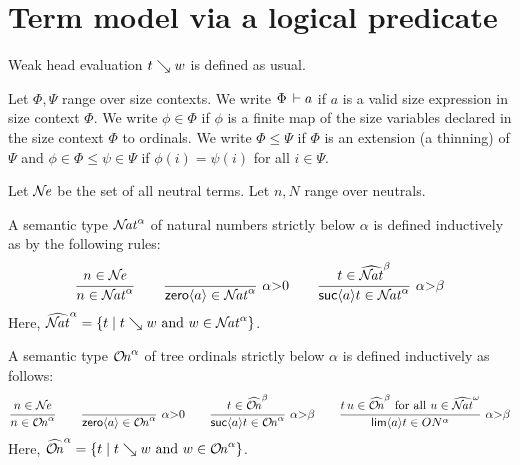 \documentclass[acmsmall,screen]{acmart}\settopmatter{}
\begin{document}
\section{Term model via a logical predicate}

Weak head evaluation $t \searrow w$ is defined as usual.

Let $\Phi,\Psi$ range over size contexts.  We write $\Phi \,\vdash a$ if
$a$ is a valid size expression in size context $\Phi$.
We write $\phi \in \Phi$ if $\phi$ is a finite map of the
size variables declared in the size context $\Phi$ to ordinals.
We write $\Phi \leq \Psi$ if $\Phi$ is an extension (a thinning) of
$\Psi$ and $\phi \in \Phi \leq \psi \in \Psi$ if $\phi(i) = \psi(i)$
for all $i \in \Psi$.

Let $\mathcal{N}\!\mathit{e}$ be the set of all neutral terms.  Let $n,N$ range over neutrals.

A semantic type ${\mathcal{N}\!\mathit{at}}^\alpha$ of natural numbers
strictly below $\alpha$ is defined inductively as by the following
rules:
\[
  \ru{n \in \NE
    }{n \in \NAT^\alpha}
\qquad
  \rux{
     }{\zero a \in \NAT^{\alpha}
     }{\alpha {>} 0}
\qquad
  \rux{t \in \NAThat^{\beta}
     }{\suc a t \in \NAT^{\alpha}
     }{\alpha {>} \beta}
\]
Here,
$\widehat{\mathcal{N}\!\mathit{at}}^\alpha = \{ t \mid t \searrow w \ \mbox{and}\  w \in {\mathcal{N}\!\mathit{at}}^\alpha \}$.

A semantic type ${\mathcal{O}\!\mathit{n}}^\alpha$ of tree ordinals strictly below $\alpha$
is defined inductively as follows:
\[
  \ru{n \in \NE
    }{n \in \ON^\alpha}
\qquad
  \rux{
     }{\zero a \in \ON^{\alpha}
     }{\alpha {>} 0}
\qquad
  \rux{t \in \ONhat^{\beta}
     }{\suc a t \in \ON^{\alpha}
     }{\alpha {>} \beta}
\qquad
  \rux{t\,u \in \ONhat^{\beta} \mforall u \in \NAThat^\omega
     }{\lim a t \in ON^{\alpha}
     }{\alpha{>}\beta}
\]
Here,
$\widehat{{\mathcal{O}\!\mathit{n}}}^\alpha = \{ t \mid t \searrow w \ \mbox{and}\  w \in {\mathcal{O}\!\mathit{n}}^\alpha \}$.
\end{document}
